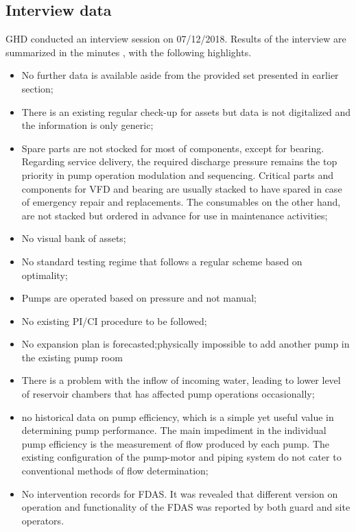 



\subsection{Interview data}
\label{213}
GHD conducted an interview session on 07/12/2018. Results of the interview are summarized in the minutes \cite{GHD2018l}, with the following highlights.

\begin{itemize}
\item No further data is available aside from the provided set presented in earlier section;
\item There is an existing regular check-up for assets but data is not digitalized and the information is only generic;
\item Spare parts are not stocked for most of components, except for bearing. Regarding service delivery, the required discharge pressure remains the top priority in pump operation modulation and sequencing. Critical parts and components for VFD and bearing are usually stacked to have spared in case of emergency repair and replacements. The consumables on the other hand, are not stacked but ordered in advance for use in maintenance activities;
\item No visual bank of assets;
\item No standard testing regime that follows a regular scheme based on optimality;
\item Pumps are operated based on pressure and not manual;
\item No existing PI/CI procedure to be followed;
\item No expansion plan is forecasted;physically impossible to add another pump in the existing pump room
\item There is a problem with the inflow of incoming water, leading to lower level of reservoir chambers that has affected pump operations occasionally;
\item no historical data on pump efficiency, which is a simple yet useful value in determining pump performance. The main impediment in  the individual pump efficiency is the measurement of flow produced by each pump. The existing configuration of the pump-motor and piping system do not cater to conventional methods of flow determination;
\item No intervention records for FDAS. It was revealed that different version on operation and functionality of the FDAS was reported by both guard and site operators.
\end{itemize}

